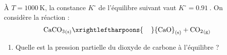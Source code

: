     \subsection{}
    
    \subsection{}
    
    À $T= \qty{1000}{\kelvin}$, la constance $K^\circ$ de l'équilibre suivant vaut $K^\circ = \qty{0.91}{}$. On considère la réaction :
    \[ {\text{Ca}\text C\text O_3}_\text{(s)} \xrightleftharpoons{\hspace{0.4cm}} {\text{Ca}\text O}_\text{(s)} + {\text C\text O_2}_\text{(g)}\]
    
    \begin{enumerate}
        \item Quelle est la pression partielle du dioxyde de carbone à l'équilibre ?
        
        
        
    \end{enumerate}

    \subsection{}

